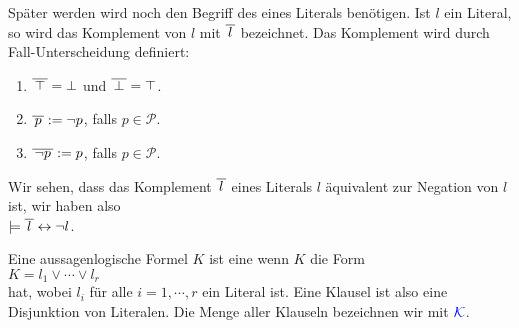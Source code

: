 Später werden wird noch den Begriff des  eines Literals benötigen.
Ist $l$ ein Literal, so wird das Komplement von $l$ mit $\overline{\,l\,}$
bezeichnet.  Das Komplement wird durch Fall-Unterscheidung definiert:
\begin{enumerate}
\item $\overline{\,\top\,} = \bot$ \quad und \quad $\overline{\,\bot\,} = \top$. 
\item $\overline{\,p\,} := \neg p$, \quad falls $p \in \mathcal{P}$.
\item $\overline{\,\neg p\,} := p$, \quad falls $p \in \mathcal{P}$.
\end{enumerate}
Wir sehen, dass das Komplement $\overline{\,l\,}$ eines Literals $l$ äquivalent zur
Negation von $l$ ist, wir haben also
\\[0.2cm]
\hspace*{1.3cm}
$\models \overline{\,l\,} \leftrightarrow \neg l$.

\begin{Definition}[Klausel]
  Eine aussagenlogische Formel $K$ ist eine  wenn $K$ die Form \\[0.2cm]
  \hspace*{1.3cm} $K = l_1 \vee \cdots \vee l_r$ \\[0.2cm]
  hat, wobei $l_i$ für alle $i=1,\cdots,r$ ein Literal ist.  Eine Klausel ist also eine
  Disjunktion von Literalen. 
  Die Menge aller Klauseln bezeichnen wir mit ${\color{blue}\mathcal{K}}$.
  \eox
\end{Definition}

